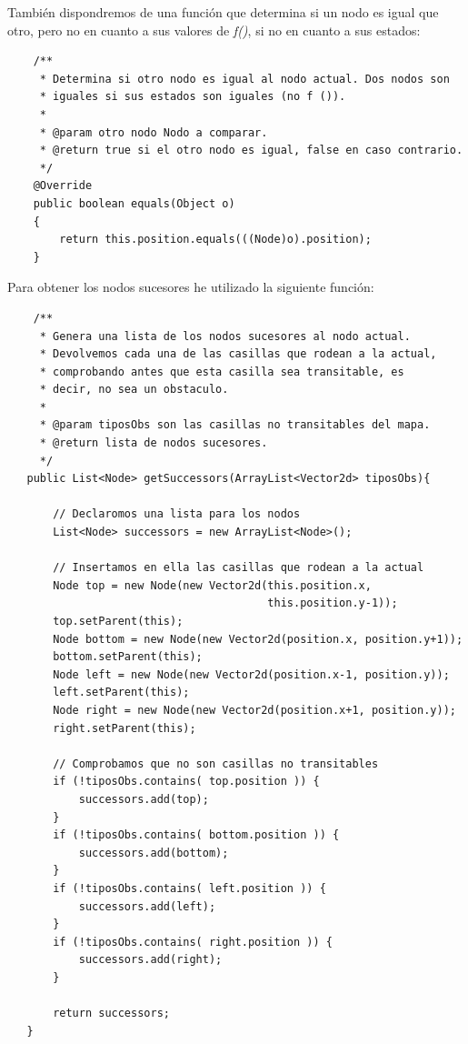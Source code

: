 \documentclass[11pt,a4paper]{article}
\begin{document}
También dispondremos de una función que determina si un nodo es igual que otro, pero no en cuanto a sus valores
de \textit{f()}, si no en cuanto a sus estados:
\newline
\begin{lstlisting}
    /**
     * Determina si otro nodo es igual al nodo actual. Dos nodos son
     * iguales si sus estados son iguales (no f ()).
     * 
     * @param otro nodo Nodo a comparar.
     * @return true si el otro nodo es igual, false en caso contrario.
     */
    @Override
    public boolean equals(Object o)
    {
        return this.position.equals(((Node)o).position);
    }
\end{lstlisting}

Para obtener los nodos sucesores he utilizado la siguiente función:
\newline
\begin{lstlisting}
    /**
     * Genera una lista de los nodos sucesores al nodo actual.
     * Devolvemos cada una de las casillas que rodean a la actual,
     * comprobando antes que esta casilla sea transitable, es
     * decir, no sea un obstaculo.
     *
     * @param tiposObs son las casillas no transitables del mapa.
     * @return lista de nodos sucesores.
     */
   public List<Node> getSuccessors(ArrayList<Vector2d> tiposObs){

       // Declaromos una lista para los nodos
       List<Node> successors = new ArrayList<Node>();
       
       // Insertamos en ella las casillas que rodean a la actual
       Node top = new Node(new Vector2d(this.position.x,
                                        this.position.y-1));
       top.setParent(this);
       Node bottom = new Node(new Vector2d(position.x, position.y+1));
       bottom.setParent(this);
       Node left = new Node(new Vector2d(position.x-1, position.y));
       left.setParent(this);
       Node right = new Node(new Vector2d(position.x+1, position.y));
       right.setParent(this);
       
       // Comprobamos que no son casillas no transitables
       if (!tiposObs.contains( top.position )) {
           successors.add(top);
       }
       if (!tiposObs.contains( bottom.position )) {
           successors.add(bottom);
       }
       if (!tiposObs.contains( left.position )) {
           successors.add(left);
       }
       if (!tiposObs.contains( right.position )) {
           successors.add(right);
       }
       
       return successors;
   }
\end{lstlisting}
\end{document}
